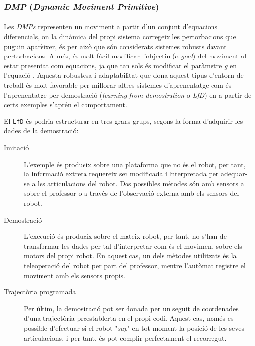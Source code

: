 \documentclass[12pt,a4paper,final,twoside]{article}
\begin{document}
\subsubsection{\textit{DMP} (\textit{\textbf{D}ynamic \textbf{M}oviment \textbf{P}rimitive})}
\label{DMP-estat-de-l'art}

\paragraph{}Les \textit{DMPs} representen un moviment a partir d'un conjunt d'equacions diferencials, on la dinàmica del propi sistema corregeix les pertorbacions que puguin aparèixer, és per això que són considerats sistemes robusts davant pertorbacions. A més, és molt fàcil modificar l'objectiu (o \textit{goal}) del moviment al estar presentat com equacions, ja que tan sols és modificar el paràmetre \textit{g} en l'equació . Aquesta robustesa i adaptabilitat que dona aquest tipus d'entorn de treball és molt favorable per millorar altres sistemes d'aprenentatge com és l'aprenentatge per demostració (\textit{learning from demostration} o \textit{LfD}) on a partir de certs exemples s'aprén el comportament.

El \texttt{LfD} és podria estructurar en tres grans grups, segons la forma d'adquirir les dades de la demostració:
\begin{description}

\item[Imitació] L'exemple és produeix sobre una plataforma que no és el robot, per tant, la informació extreta requereix ser modificada i interpretada per adequar-se a les articulacions del robot. Dos possibles mètodes són amb sensors a sobre el professor o a través de l'observació externa amb els sensors del robot.

\item[Demostració] L'execució és produeix sobre el mateix robot, per tant, no s'han de transformar les dades per tal d'interpretar com és el moviment sobre els motors del propi robot. En aquest cas, un dels mètodes utilitzats és la teleoperació del robot per part del professor, mentre l'autòmat registre el moviment amb els sensors propis.

\item[Trajectòria programada] Per últim, la demostració pot ser donada per un seguit de coordenades d'una trajectòria preestablerta en el propi codi. Aquest cas, només es possible d'efectuar si el robot "\textit{sap}" en tot moment la posició de les seves articulacions, i per tant, és pot complir perfectament el recorregut. 

\end{description}
\end{document}
